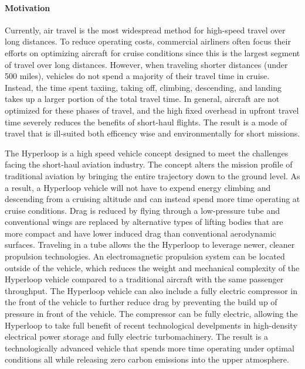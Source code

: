 \paragraph{Motivation}

	Currently, air travel is the most widespread method for high-speed travel over long distances.
	To reduce operating costs, commercial airliners often focus their efforts on optimizing aircraft for
	cruise conditions since this is the largest segment of travel over long distances.
	However, when traveling shorter distances (under 500 miles),
	vehicles do not spend a majority of their travel time in cruise.
	Instead, the time spent taxiing, taking off, climbing, descending, and landing
	takes up a larger portion of the total travel time. In general, aircraft are not optimized
	for these phases of travel, and the high fixed overhead in upfront travel time severely reduces the benefits of short-haul flights. The result is a mode of travel that is
	ill-suited both efficency wise and environmentally for short missions.

	The Hyperloop is a high speed vehicle concept designed to meet the
	challenges facing the short-haul aviation industry.
	The concept alters the mission profile of traditional aviation by bringing
	the entire trajectory down to the ground level.
	As a result, a Hyperloop vehicle will not have to expend energy climbing and descending from
	a cruising altitude and can instead spend more time operating at cruise conditions.
	Drag is reduced by flying through a low-pressure tube
	and conventional wings are replaced by alternative types of lifting bodies
	that are more compact and have lower induced drag than conventional aerodynamic surfaces.
	Traveling in a tube allows the the Hyperloop to leverage newer, cleaner propulsion technologies.
	An electromagnetic propulsion system can be located outside of the vehicle,
	which reduces the weight and mechanical complexity of the Hyperloop vehicle compared to a
	traditional aircraft with the same passenger throughput.
	The Hyperloop vehicle can also include a fully electric compressor in the front of the vehicle to
	further reduce drag by preventing the build up of pressure in front of the vehicle.
	The compressor can be fully electric, allowing the Hyperloop to take full
	benefit of recent technological develpments in
	high-density electrical power storage and fully electric turbomachinery.
	The result is a technologically advanced vehicle that spends more time operating under optimal conditions
	all while releasing zero carbon emissions into the upper atmosphere.

